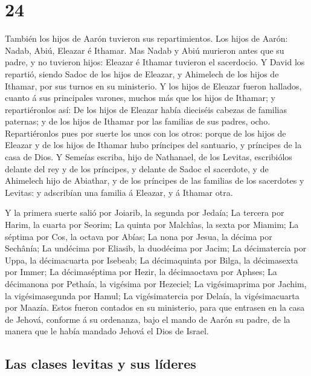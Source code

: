 \hypertarget{section-23}{%
\section{24}\label{section-23}}

 También los hijos de Aarón tuvieron sus repartimientos.
Los hijos de Aarón: Nadab, Abiú, Eleazar é Ithamar.  Mas
Nadab y Abiú murieron antes que su padre, y no tuvieron hijos: Eleazar é
Ithamar tuvieron el sacerdocio.  Y David los repartió,
siendo Sadoc de los hijos de Eleazar, y Ahimelech de los hijos de
Ithamar, por sus turnos en su ministerio.  Y los hijos de
Eleazar fueron hallados, cuanto á sus principales varones, muchos más
que los hijos de Ithamar; y repartiéronlos así: De los hijos de Eleazar
había dieciséis cabezas de familias paternas; y de los hijos de Ithamar
por las familias de sus padres, ocho.  Repartiéronlos pues
por suerte los unos con los otros: porque de los hijos de Eleazar y de
los hijos de Ithamar hubo príncipes del santuario, y príncipes de la
casa de Dios.  Y Semeías escriba, hijo de Nathanael, de
los Levitas, escribiólos delante del rey y de los príncipes, y delante
de Sadoc el sacerdote, y de Ahimelech hijo de Abiathar, y de los
príncipes de las familias de los sacerdotes y Levitas: y adscribían una
familia á Eleazar, y á Ithamar otra.

 Y la primera suerte salió por Joiarib, la segunda por
Jedaía;  La tercera por Harim, la cuarta por Seorim;
 La quinta por Malchîas, la sexta por Miamim;
 La séptima por Cos, la octava por Abías; 
La nona por Jesua, la décima por Sechânía;  La undécima
por Eliasib, la duodécima por Jacim;  La décimatercia por
Uppa, la décimacuarta por Isebeab;  La décimaquinta por
Bilga, la décimasexta por Immer;  La décimaséptima por
Hezir, la décimaoctava por Aphses;  La décimanona por
Pethaía, la vigésima por Hezeciel;  La vigésimaprima por
Jachim, la vigésimasegunda por Hamul;  La vigésimatercia
por Delaía, la vigésimacuarta por Maazía.  Estos fueron
contados en su ministerio, para que entrasen en la casa de Jehová,
conforme á su ordenanza, bajo el mando de Aarón su padre, de la manera
que le había mandado Jehová el Dios de Israel.

\hypertarget{las-clases-levitas-y-sus-luxedderes}{%
\subsection{Las clases levitas y sus
líderes}\label{las-clases-levitas-y-sus-luxedderes}}

